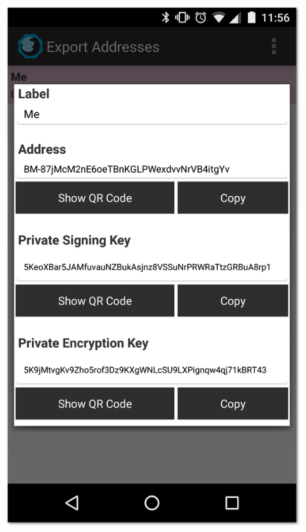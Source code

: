 \documentclass{bfh}
\begin{document}
\begin{center}
    \begin{minipage}{.3\linewidth}
      \includegraphics[width=1.0 \textwidth]{images/screenshots/bitseal_settings_export.png}
    \end{minipage}
    \hspace{.03\linewidth}
    \begin{minipage}{.3\linewidth}

\end{minipage}
\end{center}
\end{document}
